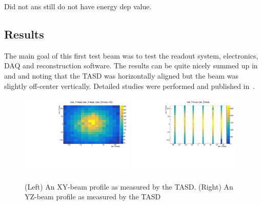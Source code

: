 Did not ans still do not have energy dep value.

\subsection{Results}

The main goal of this first test beam was to test the readout system, electronics, DAQ and reconstruction software. The results can be quite nicely summed up in  and  and noting that the TASD was horizontally aligned but the beam was slightly off-center vertically. Detailed studies were performed and published in~\cite{52Georgi}.


\begin{figure}[h!]
\centering
\includegraphics[width=0.48\textwidth]{figures/nuphys/newFigures/beamXYplane1Hadron.pdf}
\includegraphics[width=0.48\textwidth]{figures/nuphys/newFigures/beamYZhadron.pdf}
\caption{(Left) An XY-beam profile as measured by the TASD. (Right) An YZ-beam profile as measured by the TASD}
\label{fig:TASDres2}
\end{figure}

